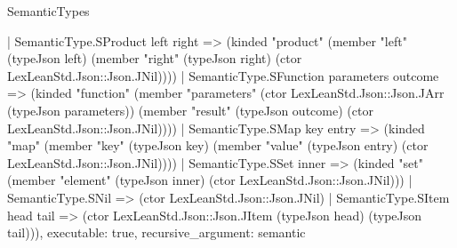 \begin{lexlean}{SemanticTypes}
\begin{semanticmodule}
{    | SemanticType.SProduct left right => (kinded "product" (member "left" (typeJson left) (member "right" (typeJson right) (ctor LexLeanStd.Json::Json.JNil))))
    | SemanticType.SFunction parameters outcome => (kinded "function" (member "parameters" (ctor LexLeanStd.Json::Json.JArr (typeJson parameters)) (member "result" (typeJson outcome) (ctor LexLeanStd.Json::Json.JNil))))
    | SemanticType.SMap key entry => (kinded "map" (member "key" (typeJson key) (member "value" (typeJson entry) (ctor LexLeanStd.Json::Json.JNil))))
    | SemanticType.SSet inner => (kinded "set" (member "element" (typeJson inner) (ctor LexLeanStd.Json::Json.JNil)))
    | SemanticType.SNil => (ctor LexLeanStd.Json::Json.JNil)
    | SemanticType.SItem head tail => (ctor LexLeanStd.Json::Json.JItem (typeJson head) (typeJson tail))),
  executable: true,
  recursive_argument: semantic
}


\end{semanticmodule}
\end{lexlean}
